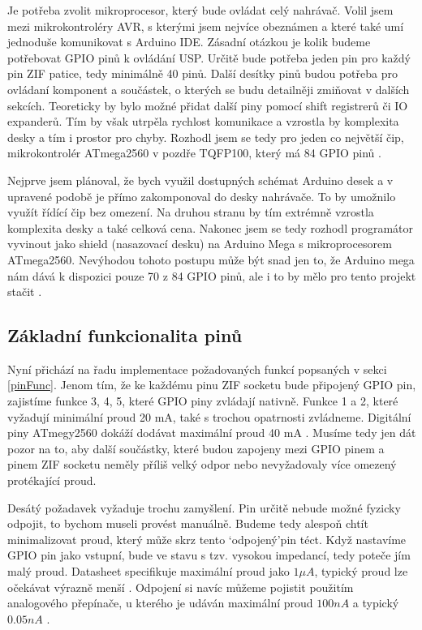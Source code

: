 \documentclass[11pt,a4paper,twoside,openright]{report}
\begin{document}
Je potřeba zvolit mikroprocesor, který bude ovládat celý nahrávač. Volil jsem mezi mikrokontroléry AVR, s kterými jsem nejvíce obeznámen a které také umí jednoduše komunikovat s Arduino IDE. Zásadní otázkou je kolik budeme potřebovat GPIO pinů k ovládání USP. Určitě bude potřeba jeden pin pro každý pin ZIF patice, tedy minimálně 40 pinů. Další desítky pinů budou potřeba pro ovládaní komponent a součástek, o kterých se budu detailněji zmiňovat v dalších sekcích. Teoreticky by bylo možné přidat další piny pomocí shift registrerů či IO expanderů. Tím by však utrpěla rychlost komunikace a vzrostla by komplexita desky a tím i prostor pro chyby. Rozhodl jsem se tedy pro jeden co největší čip, mikrokontrolér ATmega2560 v pozdře TQFP100, který má 84 GPIO pinů \cite{atmega2560}.

Nejprve jsem plánoval, že bych využil dostupných schémat Arduino desek a v upravené podobě je přímo zakomponoval do desky nahrávače. To by umožnilo využít řídící čip bez omezení. Na druhou stranu by tím extrémně vzrostla komplexita desky a také celková cena. Nakonec jsem se tedy rozhodl programátor vyvinout jako shield (nasazovací desku) na Arduino Mega s mikroprocesorem ATmega2560. Nevýhodou tohoto postupu může být snad jen to, že Arduino mega nám dává k dispozici pouze 70 z 84 GPIO pinů, ale i to by mělo pro tento projekt stačit \cite{ArduinoMega}.

\subsection {Základní funkcionalita pinů}

Nyní přichází na řadu implementace požadovaných funkcí popsaných v sekci \ref{pinFunc}. Jenom tím, že ke každému pinu ZIF socketu bude připojený GPIO pin, zajistíme funkce 3, 4, 5, které GPIO piny zvládají nativně. Funkce 1 a 2, které vyžadují minimální proud 20 mA, také s trochou opatrnosti zvládneme. Digitální piny ATmegy2560 dokáží dodávat maximální proud 40 mA \cite[str.~355-356]{atmega2560}. Musíme tedy jen dát pozor na to, aby další součástky, které budou zapojeny mezi GPIO pinem a pinem ZIF socketu neměly příliš velký odpor nebo nevyžadovaly více omezený protékající proud.

Desátý požadavek vyžaduje trochu zamyšlení. Pin určitě nebude možné fyzicky odpojit, to bychom museli provést manuálně. Budeme tedy alespoň chtít minimalizovat proud, který může skrz tento \lq odpojený\rq   pin téct. Když nastavíme GPIO pin jako vstupní, bude ve stavu s tzv. vysokou impedancí, tedy poteče jím malý proud. Datasheet specifikuje maximální proud jako $1 \mu  A$, typický proud lze očekávat výrazně menší \cite[str.~355]{atmega2560}. Odpojení si navíc můžeme pojistit použitím analogového přepínače, u kterého je udáván maximální proud $100nA$ a typický $0.05nA$ \cite[str.~3]{switch1}.
\end{document}
